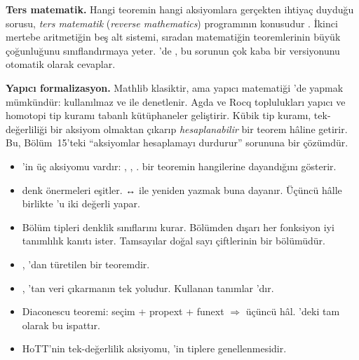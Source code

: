\begin{arastirmanotu}
\textbf{Ters matematik.} Hangi teoremin hangi aksiyomlara gerçekten ihtiyaç
duyduğu sorusu, \emph{ters matematik} (\emph{reverse mathematics})
programının konusudur \citep{simpson2009}. İkinci mertebe aritmetiğin beş
alt sistemi, sıradan matematiğin teoremlerinin büyük çoğunluğunu
sınıflandırmaya yeter. \Lean{}'de  , bu sorunun
çok kaba bir versiyonunu otomatik olarak cevaplar.

\textbf{Yapıcı formalizasyon.} Mathlib klasiktir, ama yapıcı matematiği
\Lean{}'de yapmak mümkündür:  kullanılmaz ve
  ile denetlenir. Agda ve Rocq toplulukları
yapıcı ve homotopi tip kuramı tabanlı kütüphaneler geliştirir. Kübik tip
kuramı, tek-değerliliği bir aksiyom olmaktan çıkarıp \emph{hesaplanabilir}
bir teorem hâline getirir. Bu, Bölüm~15'teki ``aksiyomlar hesaplamayı
durdurur'' sorununa bir çözümdür.
\end{arastirmanotu}

\begin{bolumozeti}
\begin{itemize}
  \item \Lean{}'in üç aksiyomu vardır: , ,
        .   bir teoremin
        hangilerine dayandığını gösterir.
  \item {} denk önermeleri eşitler. ↔ ile yeniden yazmak buna
        dayanır. Üçüncü hâlle birlikte 'u iki değerli yapar.
  \item Bölüm tipleri denklik sınıflarını kurar. Bölümden dışarı her
        fonksiyon iyi tanımlılık kanıtı ister. Tamsayılar doğal sayı
        çiftlerinin bir bölümüdür.
  \item {}, 'dan türetilen bir teoremdir.
  \item {}, 'tan veri çıkarmanın tek yoludur.
        Kullanan tanımlar 'dır.
  \item Diaconescu teoremi: seçim + propext + funext $\Rightarrow$ üçüncü
        hâl. \Lean{}'deki  tam olarak bu ispattır.
  \item HoTT'nin tek-değerlilik aksiyomu, 'in tiplere
        genellenmesidir.
\end{itemize}
\end{bolumozeti}

